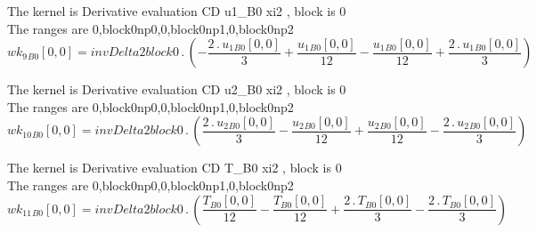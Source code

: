 \documentclass{article}
\begin{document}
\noindent The kernel is Derivative evaluation CD u1_B0 xi2 , block is 0\\\noindent The ranges are 0,block0np0,0,block0np1,0,block0np2\\\begin{dmath}{wk_{9}{_{B0}}}[{0,0}] = invDelta2block0 \,.\, \left(- \frac{2 \,.\, {u_{1}{_{B0}}}[{0,0}]}{3} + \frac{{u_{1}{_{B0}}}[{0,0}]}{12} - \frac{{u_{1}{_{B0}}}[{0,0}]}{12} + \frac{2 \,.\, {u_{1}{_{B0}}}[{0,0}]}{3}\right)\end{dmath}

\noindent The kernel is Derivative evaluation CD u2_B0 xi2 , block is 0\\\noindent The ranges are 0,block0np0,0,block0np1,0,block0np2\\\begin{dmath}{wk_{10}{_{B0}}}[{0,0}] = invDelta2block0 \,.\, \left(\frac{2 \,.\, {u_{2}{_{B0}}}[{0,0}]}{3} - \frac{{u_{2}{_{B0}}}[{0,0}]}{12} + \frac{{u_{2}{_{B0}}}[{0,0}]}{12} - \frac{2 \,.\, {u_{2}{_{B0}}}[{0,0}]}{3}\right)\end{dmath}

\noindent The kernel is Derivative evaluation CD T_B0 xi2 , block is 0\\\noindent The ranges are 0,block0np0,0,block0np1,0,block0np2\\\begin{dmath}{wk_{11}{_{B0}}}[{0,0}] = invDelta2block0 \,.\, \left(\frac{{T{_{B0}}}[{0,0}]}{12} - \frac{{T{_{B0}}}[{0,0}]}{12} + \frac{2 \,.\, {T{_{B0}}}[{0,0}]}{3} - \frac{2 \,.\, {T{_{B0}}}[{0,0}]}{3}\right)\end{dmath}
\end{document}
